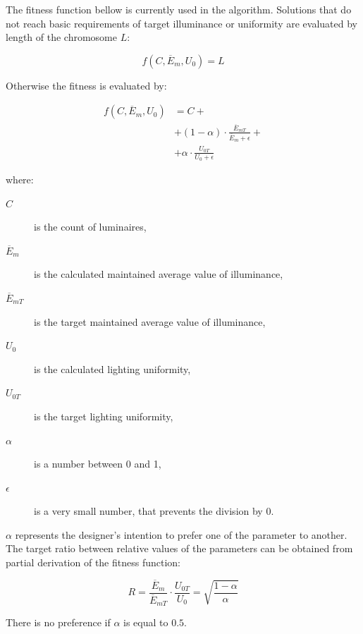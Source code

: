 The fitness function bellow is currently used in the algorithm. Solutions that do not reach basic requirements of target illuminance or uniformity are evaluated by length of the chromosome $L$:

\begin{equation}
\label{eq:fitV2EUA}
	f\left(C,\overline{E}_{m}, U_0\right)= L
\end{equation}

\noindent Otherwise the fitness is evaluated by:

\begin{equation}
\label{eq:fitV2EUB}
\begin{split}
f\left(C, \overline{E}_{m}, U_0\right)&=C +\\
& + \left( 1 - \alpha\right)\cdot\frac{\overline{E}_{mT}}{\overline{E}_{m}+\epsilon} + \\
& + \alpha\cdot\frac{U_{0T}}{U_0 + \epsilon}
\end{split}
\end{equation}

\noindent where:
\begin{description}
	\item[$C$] is the count of luminaires,
	\item[$\overline{E}_{m}$] is the calculated maintained average value of illuminance,
	\item[$\overline{E}_{mT}$] is the target maintained average value of illuminance,
	\item[$U_0$] is the calculated lighting uniformity,
	\item[$U_{0T}$] is the target lighting uniformity,
	\item[$\alpha$] is a number between 0 and 1,
	\item[$\epsilon$] is a very small number, that prevents the division by 0.
\end{description}

$\alpha$ represents the designer's intention to prefer one of the parameter to another. The target ratio between relative values of the parameters can be obtained from partial derivation of the fitness function:

\begin{equation}
\label{eq:fitV2ratio}
R =\frac{\overline{E}_{m}}{\overline{E}_{mT}}\cdot\frac{U_{0T}}{U_0}=\sqrt{\frac{1-\alpha}{\alpha}}
\end{equation}

\noindent There is no preference if $\alpha$ is equal to $0.5$.

